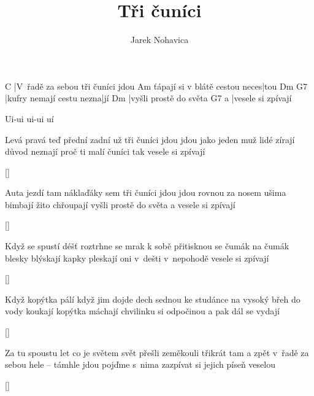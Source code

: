 \documentclass{song}
\author{Jarek Nohavica}
\title{Tři čuníci}
\begin{document}
\begin{multicols}{2}
\strophe
C
|V~řadě za sebou tři čuníci jdou
                              Am
ťápají si v blátě cestou neces|tou
Dm                       G7
|kufry nemají cestu nezna|jí
Dm
|vyšli prostě do světa
  G7
a |vesele si zpívají
\endstrophe

Ui-ui ui-ui uí
\endstrophe

\strophe*
Levá pravá teď přední zadní už
tři čuníci jdou jdou jako jeden muž
lidé zírají důvod neznají
proč ti malí čuníci
tak vesele si zpívají
\endstrophe

\ref{}

\strophe*
Auta jezdí tam náklaďáky sem
tři čuníci jdou jdou rovnou za nosem
ušima bimbají žito chřoupají
vyšli prostě do světa
a vesele si zpívají
\endstrophe

\ref{}

\columnbreak

\strophe*
Když se spustí déšť roztrhne se mrak
k sobě přitisknou se čumák na čumák
blesky blýskají kapky pleskají
oni v~dešti v~nepohodě
vesele si zpívají
\endstrophe

\ref{}

\strophe*
Když kopýtka pálí když jim dojde dech
sednou ke studánce na vysoký břeh
do vody koukají kopýtka máchají
chvilinku si odpočinou
a pak dál se vydají
\endstrophe

\ref{}

\strophe*
Za tu spoustu let co je světem svět
přešli zeměkouli třikrát tam a zpět
v~řadě za sebou hele -- támhle jdou
pojďme s~nima zazpívat si
jejich píseň veselou
\endstrophe

\ref{}

\end{multicols}
\end{document}
